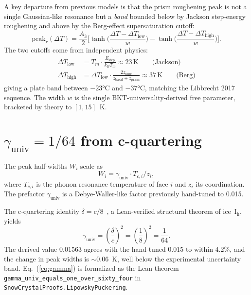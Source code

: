 \documentclass[aps,prb,reprint,superscriptaddress]{revtex4-2}
\begin{document}
A key departure from previous models is that the prism roughening peak
is not a single Gaussian-like resonance but a \emph{band} bounded below
by Jackson step-energy roughening and above by the Berg-effect
supersaturation cutoff:
\begin{equation}\label{eq:band}
  \text{peak}_r(\Delta T) = \frac{A_3}{2}\Bigg[
  \tanh\!\Big(\frac{\Delta T - \Delta T_\text{low}}{w}\Big)
  - \tanh\!\Big(\frac{\Delta T - \Delta T_\text{high}}{w}\Big)\Bigg].
\end{equation}
The two cutoffs come from independent physics:
\begin{align}
  \Delta T_\text{low} &= T_m \cdot \frac{E_\text{step}}{k_B T_m} \approx 23\,\text{K}
  \qquad\text{(Jackson)}\\
  \Delta T_\text{high} &= \Delta T_\text{low} \cdot \frac{2 z_\text{bulk}}
  {z_\text{basal} + z_\text{prism}} \approx 37\,\text{K}
  \qquad\text{(Berg)}
\end{align}
giving a plate band between $-23$°C and $-37$°C, matching the Libbrecht
2017 sequence.  The width $w$ is the single BKT-universality-derived
free parameter, bracketed by theory to $[1, 15]$~K.

\section{$\gamma_\text{univ} = 1/64$ from c-quartering}

The peak half-widths $W_i$ scale as
\begin{equation}\label{eq:W}
  W_i = \gamma_\text{univ} \cdot T_{c,i} / z_i,
\end{equation}
where $T_{c,i}$ is the phonon resonance temperature of face $i$ and
$z_i$ its coordination.  The prefactor $\gamma_\text{univ}$ is a
Debye-Waller-like factor previously hand-tuned to 0.015.

The c-quartering identity $\delta = c/8$~\cite{SnowCrystal2026}, a
Lean-verified structural theorem of ice~I$_\text{h}$, yields
\begin{equation}\label{eq:gamma}
  \gamma_\text{univ}
  = \left(\frac{\delta}{c}\right)^2
  = \left(\frac{1}{8}\right)^2 = \frac{1}{64}.
\end{equation}
The derived value $0.01563$ agrees with the hand-tuned $0.015$ to
within $4.2\%$, and the change in peak widths is $\sim 0.06$~K, well
below the experimental uncertainty band.  Eq.~(\ref{eq:gamma}) is
formalized as the Lean theorem \texttt{gamma\_univ\_equals\_one\_over\_sixty\_four}
in \texttt{SnowCrystalProofs.LipowskyPuckering}.
\end{document}
